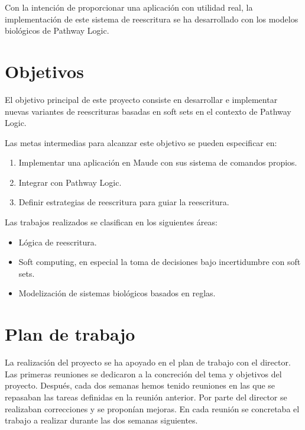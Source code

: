 Con la intención de proporcionar una aplicación con utilidad real, la implementación de este sistema de reescritura se ha desarrollado con los modelos biológicos de Pathway Logic.



\section{Objetivos}

El objetivo principal de este proyecto consiste en desarrollar e implementar nuevas variantes de reescrituras basadas en soft sets en el contexto de Pathway Logic.
\smallskip

Las metas intermedias para alcanzar este objetivo se pueden especificar en:
\begin{enumerate}
\item Implementar una aplicación en Maude con sus sistema de comandos propios.
\item Integrar con Pathway Logic.
\item Definir estrategias de reescritura para guiar la reescritura.
\end{enumerate}

Las trabajos realizados se clasifican en los siguientes áreas:
\begin{itemize}
\item Lógica de reescritura.
\item Soft computing, en especial la toma de decisiones bajo incertidumbre con soft sets.
\item Modelización de sistemas biológicos basados en reglas.
\end{itemize}


\section{Plan de trabajo}

La realización del proyecto se ha apoyado en el plan de trabajo con el director. 
%
Las primeras reuniones se dedicaron a la concreción del tema y objetivos del proyecto.
Después, cada dos semanas hemos tenido reuniones en las que se repasaban las tareas definidas en la reunión anterior.
Por parte del director se realizaban correcciones y se proponían mejoras.
En cada reunión se concretaba el trabajo a realizar durante las dos semanas siguientes.


